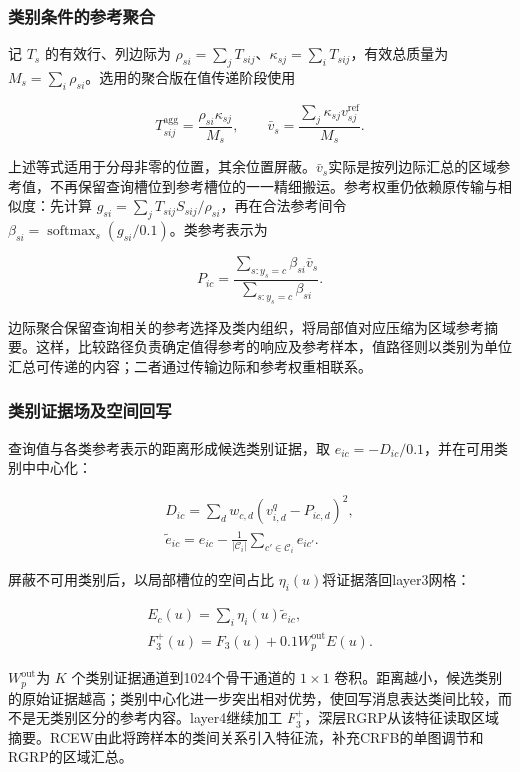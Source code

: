 \documentclass[journal,10pt,a4paper]{IEEEtran}
\begin{document}
\subsubsection{类别条件的参考聚合}\label{ux7c7bux522bux6761ux4ef6ux7684ux53c2ux8003ux805aux5408}

记 \(T_s\) 的有效行、列边际为 \(\rho_{si}=\sum_jT_{sij}\)、\(\kappa_{sj}=\sum_iT_{sij}\)，有效总质量为 \(M_s=\sum_i\rho_{si}\)。选用的聚合版在值传递阶段使用

\[T^{\mathrm{agg}}_{sij}=\frac{\rho_{si}\kappa_{sj}}{M_s},\qquad \bar v_s=\frac{\sum_j\kappa_{sj}v^{\mathrm{ref}}_{sj}}{M_s}.\tag{8}\]

上述等式适用于分母非零的位置，其余位置屏蔽。\(\bar v_s\)实际是按列边际汇总的区域参考值，不再保留查询槽位到参考槽位的一一精细搬运。参考权重仍依赖原传输与相似度：先计算 \(g_{si}=\sum_jT_{sij}S_{sij}/\rho_{si}\)，再在合法参考间令 \(\beta_{si}=\operatorname{softmax}_s(g_{si}/0.1)\)。类参考表示为

\[P_{ic}=\frac{\sum_{s:y_s=c}\beta_{si}\bar v_s}
{\sum_{s:y_s=c}\beta_{si}}. \tag{9}\]

边际聚合保留查询相关的参考选择及类内组织，将局部值对应压缩为区域参考摘要。这样，比较路径负责确定值得参考的响应及参考样本，值路径则以类别为单位汇总可传递的内容；二者通过传输边际和参考权重相联系。

\subsubsection{类别证据场及空间回写}\label{ux7c7bux522bux8bc1ux636eux573aux53caux7a7aux95f4ux56deux5199}

查询值与各类参考表示的距离形成候选类别证据，取 \(e_{ic}=-D_{ic}/0.1\)，并在可用类别中中心化：

\[\begin{gathered}
D_{ic}=\sum_d w_{c,d}(v^q_{i,d}-P_{ic,d})^2,\\
\widetilde e_{ic}=e_{ic}-\frac{1}{|\mathcal C_i|}\sum_{c'\in\mathcal C_i}e_{ic'}.
\end{gathered}\tag{10}\]

屏蔽不可用类别后，以局部槽位的空间占比 \(\eta_i(u)\)将证据落回layer3网格：

\[\begin{gathered}
E_c(u)=\sum_i\eta_i(u)\widetilde e_{ic},\\
F_3^{+}(u)=F_3(u)+0.1W_p^{\mathrm{out}}E(u).
\end{gathered}\tag{11}\]

\(W_p^{\mathrm{out}}\)为 \(K\) 个类别证据通道到1024个骨干通道的 \(1\times1\) 卷积。距离越小，候选类别的原始证据越高；类别中心化进一步突出相对优势，使回写消息表达类间比较，而不是无类别区分的参考内容。layer4继续加工 \(F_3^{+}\)，深层RGRP从该特征读取区域摘要。RCEW由此将跨样本的类间关系引入特征流，补充CRFB的单图调节和RGRP的区域汇总。
\end{document}
